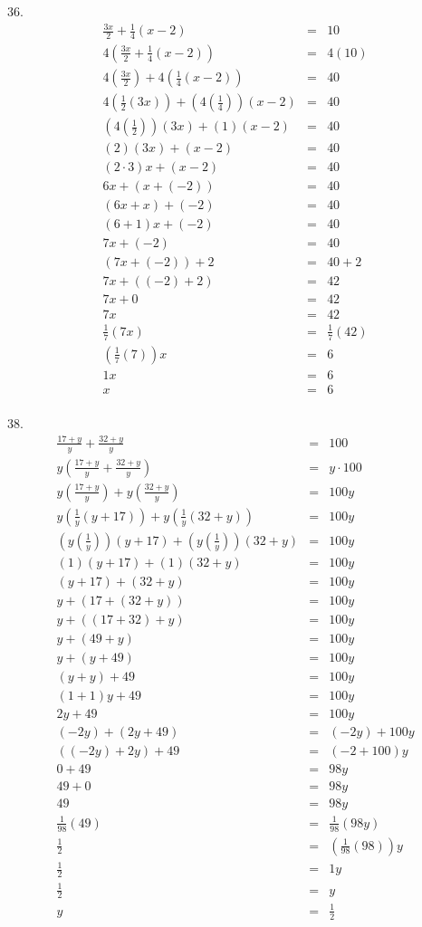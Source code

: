 \documentclass[letterpaper]{article}
\begin{document}
36.
\begin{eqnarray*}
\frac{3x}{2}+\frac{1}{4}(x-2) &=& 10 \\
4(\frac{3x}{2}+\frac{1}{4}(x-2)) &=& 4(10) \\
4(\frac{3x}{2})+4(\frac{1}{4}(x-2)) &=& 40 \\
4(\frac{1}{2}(3x))+(4(\frac{1}{4}))(x-2) &=& 40 \\
(4(\frac{1}{2}))(3x)+(1)(x-2) &=& 40 \\
(2)(3x)+(x-2) &=& 40 \\
(2\cdot3)x+(x-2) &=& 40 \\
6x+(x+(-2)) &=& 40 \\
(6x+x)+(-2) &=& 40 \\
(6+1)x+(-2) &=& 40 \\
7x+(-2) &=& 40 \\
(7x+(-2))+2 &=& 40+2 \\
7x+((-2)+2) &=& 42 \\
7x+0 &=& 42 \\
7x &=& 42 \\
\frac{1}{7}(7x) &=& \frac{1}{7}(42) \\
(\frac{1}{7}(7))x &=& 6 \\
1x &=& 6 \\
x &=& 6 \\
\end{eqnarray*}

38.
\begin{eqnarray*}
\frac{17+y}{y}+\frac{32+y}{y} &=& 100 \\
y(\frac{17+y}{y}+\frac{32+y}{y}) &=& y\cdot100 \\
y(\frac{17+y}{y})+y(\frac{32+y}{y}) &=& 100y \\
y(\frac{1}{y}(y+17))+y(\frac{1}{y}(32+y)) &=& 100y \\
(y(\frac{1}{y}))(y+17)+(y(\frac{1}{y}))(32+y) &=& 100y \\
(1)(y+17)+(1)(32+y) &=& 100y \\
(y+17)+(32+y) &=& 100y \\
y+(17+(32+y)) &=& 100y \\
y+((17+32)+y) &=& 100y \\
y+(49+y) &=& 100y \\
y+(y+49) &=& 100y \\
(y+y)+49 &=& 100y \\
(1+1)y+49 &=& 100y \\
2y+49 &=& 100y \\
(-2y)+(2y+49) &=& (-2y)+100y \\
((-2y)+2y)+49 &=& (-2+100)y \\
0+49 &=& 98y \\
49+0 &=& 98y \\
49 &=& 98y \\
\frac{1}{98}(49) &=& \frac{1}{98}(98y) \\
\frac{1}{2} &=& (\frac{1}{98}(98))y \\
\frac{1}{2} &=& 1y \\
\frac{1}{2} &=& y \\
y &=& \frac{1}{2} \\
\end{eqnarray*}
\end{document}
